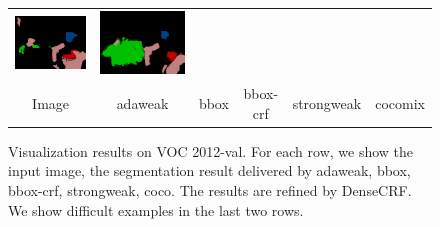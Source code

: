 \begin{figure}[!htbp]
{\begin{tabular}{c c c c c c}
    \includegraphics[height=0.11\linewidth]{fig/val_crf_vis/strongweak/2007_001175.png} &
    \includegraphics[height=0.11\linewidth]{fig/val_crf_vis/cocomix/2007_001175.png} \\
    Image & adaweak & bbox & bbox-crf & strongweak & cocomix \\
  \end{tabular}
  }
  \caption{Visualization results on VOC 2012-val. For each row, we show the input image, the segmentation result delivered by adaweak, bbox, bbox-crf, strongweak, coco. The results are refined by DenseCRF. We show difficult examples in the last two rows.} 
  \label{fig:ValResults}
\end{figure}





